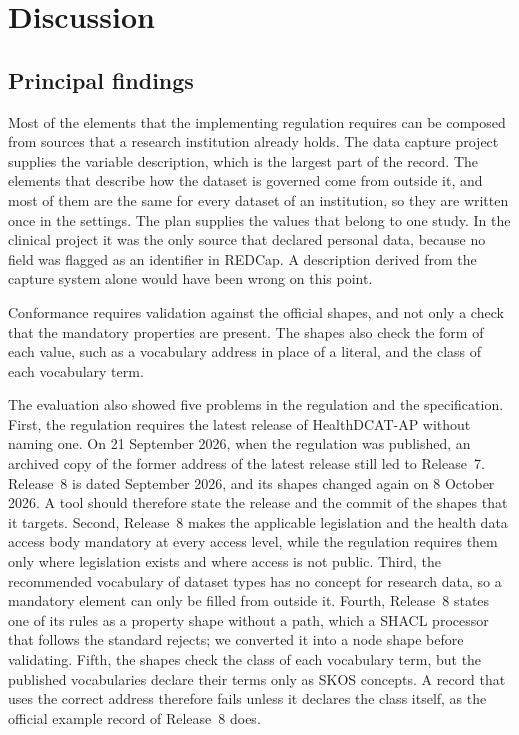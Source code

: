 \documentclass[12pt]{article}
\begin{document}
\section{Discussion}

\subsection{Principal findings}

Most of the elements that the implementing regulation requires can be composed from
sources that a research institution already holds. The data capture project supplies the
variable description, which is the largest part of the record. The elements that
describe how the dataset is governed come from outside it, and most of them are the same
for every dataset of an institution, so they are written once in the settings. The plan
supplies the values that belong to one study. In the clinical project it was the only
source that declared personal data, because no field was flagged as an identifier in
REDCap. A description derived from the capture system alone would have been wrong on
this point.

Conformance requires validation against the official shapes, and not only a check that
the mandatory properties are present. The shapes also check the form of each value, such
as a vocabulary address in place of a literal, and the class of each vocabulary term.

The evaluation also showed five problems in the regulation and the specification. First, the regulation
requires the latest release of HealthDCAT-AP without naming one. On 21 September 2026,
when the regulation was published, an archived copy of the former address of the latest
release still led to Release~7. Release~8 is
dated September 2026, and its shapes changed again on 8 October 2026. A tool should
therefore state the release and the commit of the shapes that it targets. Second, Release~8 makes
the applicable legislation and the health data access body mandatory at every access
level, while the regulation requires them only where legislation exists and where access
is not public. Third, the recommended vocabulary of dataset types has no concept for
research data, so a mandatory element can only be filled from outside it. Fourth, Release~8
states one of its rules as a property shape without a path, which a SHACL processor that
follows the standard rejects; we converted it into a node shape before validating.
Fifth, the shapes check the class of each vocabulary term, but the published vocabularies
declare their terms only as SKOS concepts. A record that uses the correct address
therefore fails unless it declares the class itself, as the official example record of
Release~8 does.
\end{document}
